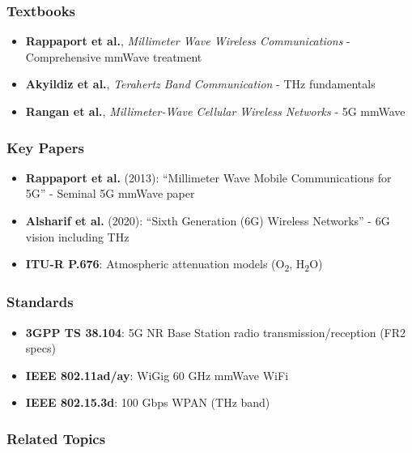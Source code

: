 \subsubsection{Textbooks}\label{textbooks}

\begin{itemize}
\tightlist
\item
  \textbf{Rappaport et al.}, \emph{Millimeter Wave Wireless
  Communications} - Comprehensive mmWave treatment
\item
  \textbf{Akyildiz et al.}, \emph{Terahertz Band Communication} - THz
  fundamentals
\item
  \textbf{Rangan et al.}, \emph{Millimeter-Wave Cellular Wireless
  Networks} - 5G mmWave
\end{itemize}

\subsubsection{Key Papers}\label{key-papers}

\begin{itemize}
\tightlist
\item
  \textbf{Rappaport et al.} (2013): ``Millimeter Wave Mobile
  Communications for 5G'' - Seminal 5G mmWave paper
\item
  \textbf{Alsharif et al.} (2020): ``Sixth Generation (6G) Wireless
  Networks'' - 6G vision including THz
\item
  \textbf{ITU-R P.676}: Atmospheric attenuation models
  (O\textsubscript{2},
  H\textsubscript{2}O)
\end{itemize}

\subsubsection{Standards}\label{standards}

\begin{itemize}
\tightlist
\item
  \textbf{3GPP TS 38.104}: 5G NR Base Station radio
  transmission/reception (FR2 specs)
\item
  \textbf{IEEE 802.11ad/ay}: WiGig 60 GHz mmWave WiFi
\item
  \textbf{IEEE 802.15.3d}: 100 Gbps WPAN (THz band)
\end{itemize}

\subsubsection{Related Topics}\label{related-topics}

